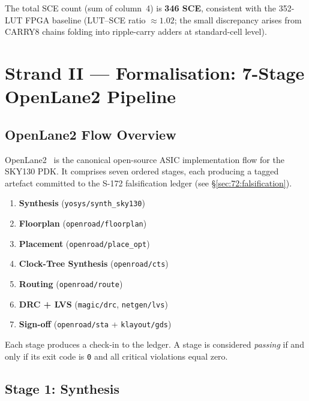 \noindent
The total SCE count (sum of column~4) is \textbf{346 SCE},
consistent with the 352-LUT FPGA baseline
(LUT–SCE ratio $\approx 1.02$; the small discrepancy arises from
CARRY8 chains folding into ripple-carry adders at standard-cell level).

\section{Strand II — Formalisation: 7-Stage OpenLane2 Pipeline}
\label{sec:72:strand-ii}

\subsection{OpenLane2 Flow Overview}
\label{subsec:72:ol2-overview}

OpenLane2~\cite{edwards2022sky130} is the canonical open-source ASIC
implementation flow for the SKY130 PDK.
It comprises seven ordered stages, each producing a tagged artefact
committed to the S-172 falsification ledger
(see \S\ref{sec:72:falsification}).

\begin{enumerate}
  \item \textbf{Synthesis} (\texttt{yosys/synth\_sky130})
  \item \textbf{Floorplan} (\texttt{openroad/floorplan})
  \item \textbf{Placement} (\texttt{openroad/place\_opt})
  \item \textbf{Clock-Tree Synthesis} (\texttt{openroad/cts})
  \item \textbf{Routing} (\texttt{openroad/route})
  \item \textbf{DRC + LVS} (\texttt{magic/drc}, \texttt{netgen/lvs})
  \item \textbf{Sign-off} (\texttt{openroad/sta} + \texttt{klayout/gds})
\end{enumerate}

Each stage produces a check-in to the ledger.
A stage is considered \emph{passing} if and only if its exit code is
\texttt{0} and all critical violations equal zero.

\subsection{Stage 1: Synthesis}
\label{subsec:72:stage1-synth}

